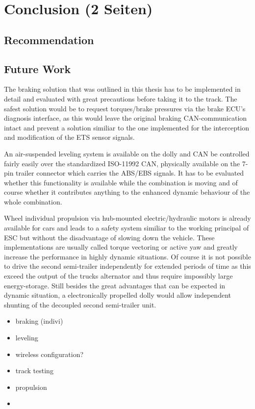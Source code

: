 \documentclass[ExampleMasters.tex]{subfiles}
\begin{document}
\clearpage
\chapter{Conclusion (2 Seiten)}
\label{chap:conclusion}

\section{Recommendation}
\label{sec:recommendation}



\section{Future Work}
\label{sec:future_work}

The braking solution that was outlined in this thesis has to be implemented in detail and evaluated with great  precautions before taking it to the track. The safest solution would be to request torques/brake pressures via the brake \gls{ECU}'s diagnosis interface, as this would leave the original braking CAN-communication intact and prevent a solution similiar to the one implemented for the interception and modification of the \gls{ETS} sensor signals. 

An air-suspended leveling system is available on the dolly and \gls{CAN} be controlled fairly easily over the standardized ISO-11992 CAN, physically available on the 7-pin trailer connector which carries the \gls{ABS}/\gls{EBS} signals. It has to be evaluated whether this functionality is available while the combination is moving and of course whether it contributes anything to the enhanced dynamic behaviour of the whole combination.

Wheel individual propulsion via hub-mounted electric/hydraulic motors is already available for cars and leads to a safety system similiar to the working principal of \gls{ESC} but without the disadvantage of slowing down the vehicle. These implementations are usually called torque vectoring or active yaw and greatly increase the performance in highly dynamic situations. Of course it is not possible to drive the second semi-trailer independently for extended periods of time as this exceed the output of the trucks alternator and thus require impossibly large energy-storage. Still besides the great advantages that can be expected in dynamic situation, a electronically propelled dolly would allow independent shunting of the decoupled second semi-trailer unit.



\begin{itemize}
	\item braking (indivi)
	\item leveling
	\item wireless configuration?
	\item track testing
	\item propulsion
	\item 
\end{itemize}
\end{document}
